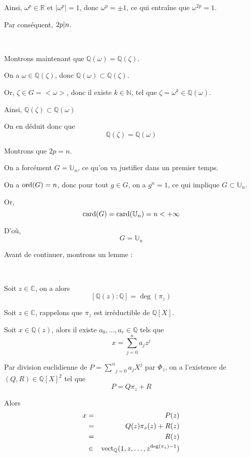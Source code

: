 Ainsi, $\omega^p \in \mathbb{R}$ et $| \omega^p | = 1$, donc $\omega^p = \pm
1$, ce qui entra{\^i}ne que $\omega^{2 p} = 1$.

Par cons{\'e}quent, $2 p | n $.

\

Montrons maintenant que $\mathbb{Q} (\omega) =\mathbb{Q} (\zeta)$.

On a $\omega \in \mathbb{Q} (\zeta)$, donc $\mathbb{Q} (\omega) \subset
\mathbb{Q} (\zeta)$.

Or, $\zeta \in G = < \omega >$, donc il existe $k \in \mathbb{N}$, tel que
$\zeta = \omega^k \in \mathbb{Q} (\omega)$.

Ainsi, $\mathbb{Q} (\zeta) \subset \mathbb{Q} (\omega)$

On en d{\'e}duit donc que
\[ \mathbb{Q} (\zeta) =\mathbb{Q} (\omega) \]


 Montrons que $2 p = n$.

On a forc{\'e}ment $G =\mathbb{U}_n$, ce qu'on va justifier dans un premier
temps.

On a $\operatorname{ord} (G) = n$, donc pour tout $g \in G$, on a $g^n = 1$, ce qui
implique $G \subset \mathbb{U}_n$.

Or,
\[ \operatorname{card} (G) = \operatorname{card} (\mathbb{U}_n) = n < + \infty \]


D'o{\`u},
\[ G =\mathbb{U}_n \]


Avant de continuer, montrons un lemme :

\


Soit $z \in \mathbb{C}$, on a alors
\[ [\mathbb{Q} (z) : \mathbb{Q}] = \deg (\pi_z) \]



Soit $z \in \mathbb{C}$, rappelons que $\pi_z$ est irr{\'e}ductible de
$\mathbb{Q} [X]$.

Soit $x \in \mathbb{Q} (z)$, alors il existe $a_0, \ldots, a_r \in \mathbb{Q}$
tels que
\[ x = \underset{j = 0}{\overset{n}{\sum}} a_j z^j \]


Par division euclidienne de $P = \underset{j = 0}{\overset{n}{\sum}} a_j X^j$
par $\Phi_z$, on a l'existence de $(Q, R) \in \mathbb{Q} [X]^2$ tel que
\[ P = Q \pi_z + R \]


Alors
\begin{eqnarray*}
  x & = & P (z)\\
  & = & Q (z) \pi_z (z) + R (z)\\
  & = & R (z)\\
  & \in & \operatorname{vect}_{\mathbb{Q}} (1, z, \ldots, z^{\deg (\pi_z) - 1})
\end{eqnarray*}


